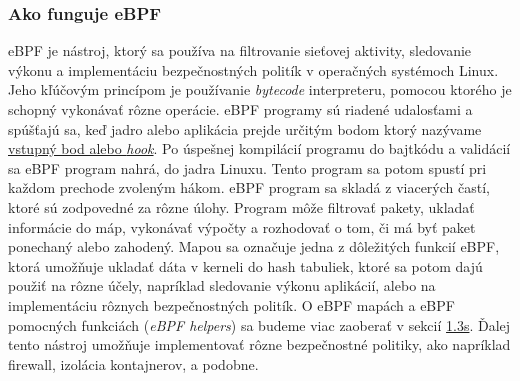 \subsubsection{Ako funguje eBPF} 
eBPF je nástroj, ktorý sa používa na filtrovanie sieťovej aktivity, sledovanie výkonu a implementáciu bezpečnostných politík v operačných systémoch Linux. 
Jeho kľúčovým princípom je používanie \emph{bytecode} interpreteru, pomocou ktorého je schopný vykonávať rôzne operácie. eBPF programy sú riadené udalosťami a 
spúšťajú sa, keď jadro alebo aplikácia prejde určitým bodom ktorý nazývame \hyperref[sec:hooks]{vstupný bod alebo \emph{hook}}.  Po úspešnej kompilácií 
programu do bajtkódu a validácií sa eBPF program nahrá, do jadra Linuxu. Tento program sa potom spustí pri každom prechode zvoleným hákom. 
eBPF program sa skladá z viacerých častí, ktoré sú zodpovedné za rôzne úlohy. Program môže filtrovať pakety, ukladať informácie do máp, vykonávať výpočty 
a rozhodovať o tom, či má byť paket ponechaný alebo zahodený. Mapou sa označuje jedna z dôležitých funkcií eBPF, ktorá umožňuje ukladať dáta v kerneli 
do hash tabuliek, ktoré sa potom dajú použiť na rôzne účely, napríklad sledovanie výkonu aplikácií, alebo na implementáciu rôznych bezpečnostných politík. 
O eBPF mapách a eBPF pomocných funkciách (\emph{eBPF helpers}) sa budeme viac zaoberať v sekcií \hyperref[sec:architecture]{1.3s}. 
Ďalej tento nástroj umožňuje implementovať rôzne bezpečnostné politiky, ako napríklad firewall, izolácia kontajnerov, a podobne.

